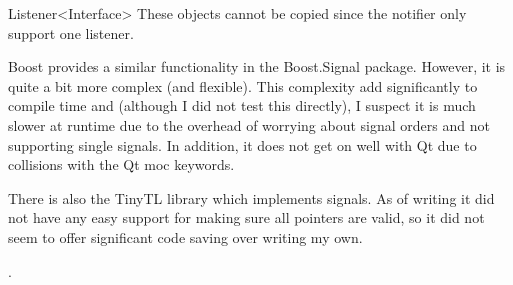 \begin{ccRefClass}{Listener<Interface>}
  These objects cannot be copied since the notifier only support one
  listener.

  Boost provides a similar functionality in the Boost.Signal
  package. However, it is quite a bit more complex (and
  flexible). This complexity add significantly to compile time and
  (although I did not test this directly), I suspect it is much slower
  at runtime due to the overhead of worrying about signal orders and
  not supporting single signals. In addition, it does not get on well
  with Qt due to collisions with the Qt moc keywords.

  There is also the TinyTL library which implements signals. As of
  writing it did not have any easy support for making sure all
  pointers are valid, so it did not seem to offer significant code
  saving over writing my own.


\ccTypes



\ccCreation
{}  %


\ccOperations



\ccSeeAlso

.

\ccExample




\end{ccRefClass}



